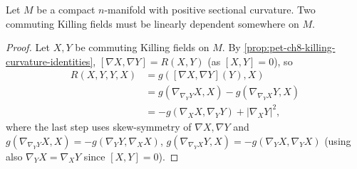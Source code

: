 \begin{theorem}
  \label{thm:pet-ch8-grove-searle-commuting-dependent}
  Let $M$ be a compact $n$-manifold with positive sectional curvature. Two
  commuting Killing fields must be linearly dependent somewhere on $M$.
\end{theorem}
\begin{proof}
  Let $X,Y$ be commuting Killing fields on $M$. By
  \cref{prop:pet-ch8-killing-curvature-identities}, $[\nabla X,\nabla Y]=R(X,Y)$
  (as $[X,Y]=0$), so
  \begin{align*}
    R(X,Y,Y,X)&=g([\nabla X,\nabla Y](Y),X)\\
    &=g(\nabla_{\nabla_YY}X,X)-g(\nabla_{\nabla_YX}Y,X)\\
    &=-g(\nabla_XX,\nabla_YY)+|\nabla_XY|^2,
  \end{align*}
  where the last step uses skew-symmetry of $\nabla X,\nabla Y$ and
  $g(\nabla_{\nabla_YY}X,X)=-g(\nabla_YY,\nabla_XX)$,
  $g(\nabla_{\nabla_YX}Y,X)=-g(\nabla_YX,\nabla_YX)$ (using also
  $\nabla_YX=\nabla_XY$ since $[X,Y]=0$).


\end{proof}
